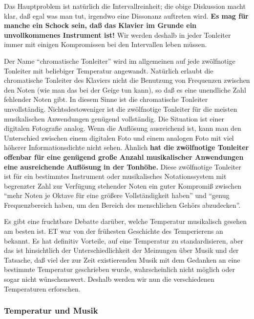 Das Hauptproblem ist natürlich die Intervallreinheit; die obige Diskussion macht klar, daß egal was man tut, irgendwo eine Dissonanz auftreten wird.
\textbf{Es mag für manche ein Schock sein, daß das Klavier im Grunde ein unvollkommenes Instrument ist!}
Wir werden deshalb in jeder Tonleiter immer mit einigen Kompromissen bei den Intervallen leben müssen.

Der Name \enquote{chromatische Tonleiter} wird im allgemeinen auf jede zwölfnotige Tonleiter mit beliebiger Temperatur angewandt.
Natürlich erlaubt die chromatische Tonleiter des Klaviers nicht die Benutzung von Frequenzen zwischen den Noten (wie man das bei der Geige tun kann), so daß es eine unendliche Zahl fehlender Noten gibt.
In diesem Sinne ist die chromatische Tonleiter unvollständig.
Nichtsdestoweniger ist die zwölfnotige Tonleiter für die meisten musikalischen Anwendungen genügend vollständig.
Die Situation ist einer digitalen Fotografie analog.
Wenn die Auflösung ausreichend ist, kann man den Unterschied zwischen einem digitalen Foto und einem analogen Foto mit viel höherer Informationsdichte nicht sehen.
Ähnlich \textbf{hat die zwölfnotige Tonleiter offenbar für eine genügend große Anzahl musikalischer Anwendungen eine ausreichende Auflösung in der Tonhöhe.}
Diese zwölfnotige Tonleiter ist für ein bestimmtes Instrument oder musikalisches Notationssystem mit begrenzter Zahl zur Verfügung stehender Noten ein guter Kompromiß zwischen \enquote{mehr Noten je Oktave für eine größere Vollständigkeit haben} und \enquote{genug Frequenzbereich haben, um den Bereich des menschlichen Gehörs abzudecken}.

Es gibt eine fruchtbare Debatte darüber, welche Temperatur musikalisch gesehen am besten ist.
ET war von der frühesten Geschichte des Temperierens an bekannt.
Es hat definitiv Vorteile, auf eine Temperatur zu standardisieren, aber das ist hinsichtlich der Unterschiedlichkeit der Meinungen über Musik und der Tatsache, daß viel der zur Zeit existierenden Musik mit dem Gedanken an eine bestimmte Temperatur geschrieben wurde, wahrscheinlich nicht möglich oder sogar nicht wünschenswert.
Deshalb werden wir nun die verschiedenen Temperaturen erforschen.
 

\label{c2_2c}
\subsubsection{Temperatur und Musik}
\label{c2_2_temp} 

